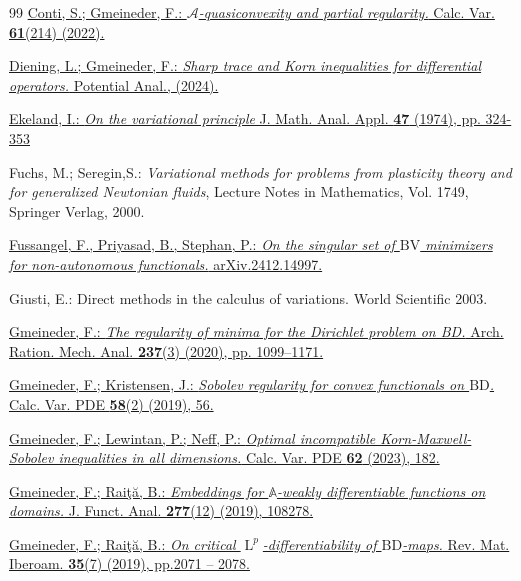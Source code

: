\documentclass[a4paper,10pt,reqno,oneside]{amsart}
\numberwithin{equation}{section}
\newcommand{\A}{\mathscr{A}}
\newcommand{\Aop}{\mathbb{A}}
\newcommand{\lebe}{\operatorname{L}}
\newcommand{\BV}{\mathrm{BV}}
\begin{document}
\begin{thebibliography}{99}
\href{https://doi.org/10.1007/s00526-022-02326-0}{Conti, S.; Gmeineder, F.: \textit{$\A$-quasiconvexity and partial regularity.} Calc. Var. \textbf{61}(214) (2022).}

 \href{ https://doi.org/10.1007/s11118-024-10165-1}{Diening, L.; Gmeineder, F.: \textit{Sharp trace and Korn inequalities for differential operators.} Potential Anal., (2024).}

\href{https://doi.org/10.1016/0022-247X(74)90025-0}{Ekeland, I.: \textit{On the variational principle} J. Math. Anal. Appl. \textbf{47} (1974), pp. 324-353}

 Fuchs, M.; Seregin,S.: \textit{Variational methods for problems from plasticity theory and for generalized Newtonian fluids}, Lecture Notes in Mathematics, Vol. 1749, Springer Verlag, 2000.

 \href{https://arxiv.org/abs/2412.14997}{Fussangel, F., Priyasad, B., Stephan, P.: \textit{On the singular set of $\BV$ minimizers for non-autonomous functionals.} arXiv.2412.14997.}

 Giusti, E.: Direct methods in the calculus of variations. World Scientific 2003.

 \href{https://doi.org/10.1007/s00205-020-01507-5}{Gmeineder, F.: \textit{The regularity of minima for the Dirichlet problem on BD.} Arch. Ration. Mech. Anal. \textbf{237}(3) (2020), pp. 1099--1171.}

 \href{https://doi.org/10.1007/s00526-019-1491-6}{Gmeineder, F.; Kristensen, J.: \textit{Sobolev regularity for convex functionals on $\mathrm{BD}$.} Calc. Var. PDE \textbf{58}(2) (2019), 56.}

 \href{https://doi.org/10.1007/s00526-023-02522-6}{Gmeineder, F.; Lewintan, P.; Neff, P.: \textit{Optimal incompatible Korn-Maxwell-Sobolev inequalities in all dimensions.} Calc. Var. PDE \textbf{62} (2023), 182.}

 \href{https://doi.org/10.1016/j.jfa.2019.108278}{Gmeineder, F.; Rai\c{t}\u{a}, B.: \textit{Embeddings for $\Aop$-weakly differentiable functions on domains.} J. Funct. Anal. \textbf{277}(12) (2019), 108278.}

 \href{https://doi.org/10.4171/rmi/1111}{Gmeineder, F.; Rai\c{t}\u{a}, B.: \textit{On critical $\lebe^p$-differentiability of $\mathrm{BD}$-maps.} Rev. Mat. Iberoam. \textbf{35}(7) (2019), pp.2071 -- 2078.}


\end{thebibliography}
\end{document}
